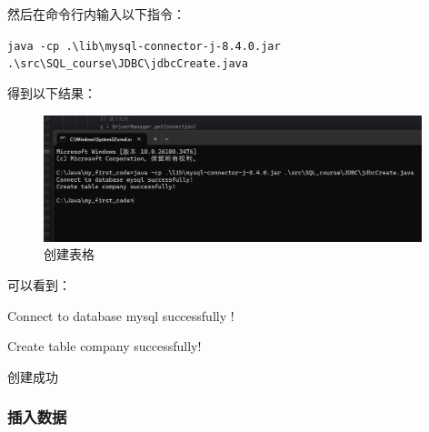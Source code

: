\documentclass{article}
\begin{document}
	然后在命令行内输入以下指令：
	
	\verb|java -cp .\lib\mysql-connector-j-8.4.0.jar .\src\SQL_course\JDBC\jdbcCreate.java|
	
	得到以下结果：
	
	\begin{figure}[H]
		\centering
		\includegraphics[width=11cm]{./images/7.创建表格.png}
		\caption{创建表格}
	\end{figure}
	
	可以看到：
	
	Connect to database mysql successfully !
	
	Create table company successfully!
	
	创建成功
	
	\subsubsection{插入数据}
	
\end{document}
